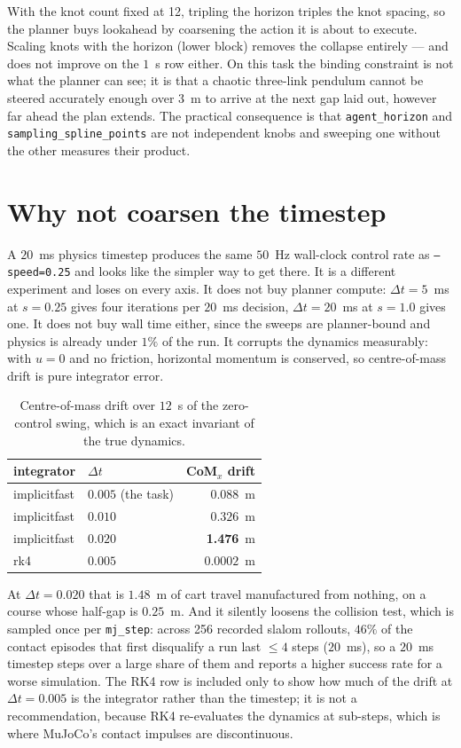 \documentclass[conference]{IEEEtran}
\begin{document}
With the knot count fixed at 12, tripling the horizon triples the knot spacing,
so the planner buys lookahead by coarsening the action it is about to execute.
Scaling knots with the horizon (lower block) removes the collapse entirely ---
and does not improve on the $1$~s row either. On this task the binding constraint
is not what the planner can see; it is that a chaotic three-link pendulum cannot
be steered accurately enough over $3$~m to arrive at the next gap laid out,
however far ahead the plan extends. The practical consequence is that
\texttt{agent\_horizon} and \texttt{sampling\_spline\_points} are not independent
knobs and sweeping one without the other measures their product.

\section{Why not coarsen the timestep}
\label{app:timestep}

A $20$~ms physics timestep produces the same $50$~Hz wall-clock control rate as
\texttt{--speed=0.25} and looks like the simpler way to get there. It is a
different experiment and loses on every axis. It does not buy planner compute:
$\Delta t = 5$~ms at $s = 0.25$ gives four iterations per $20$~ms decision,
$\Delta t = 20$~ms at $s = 1.0$ gives one. It does not buy wall time either,
since the sweeps are planner-bound and physics is already under $1\%$ of the run.
It corrupts the dynamics measurably: with $u = 0$ and no friction, horizontal
momentum is conserved, so centre-of-mass drift is pure integrator error.

\begin{table}[h]
\caption{Centre-of-mass drift over $12$~s of the zero-control swing, which is an
exact invariant of the true dynamics.}
\label{tab:timestep}
\centering
\begin{tabular}{@{}llr@{}}
\toprule
integrator & $\Delta t$ & CoM$_x$ drift \\
\midrule
implicitfast & $0.005$ (the task) & $0.088$~m \\
implicitfast & $0.010$ & $0.326$~m \\
implicitfast & $0.020$ & \textbf{1.476}~m \\
rk4          & $0.005$ & $0.0002$~m \\
\bottomrule
\end{tabular}
\end{table}

At $\Delta t = 0.020$ that is $1.48$~m of cart travel manufactured from nothing,
on a course whose half-gap is $0.25$~m. And it silently loosens the collision
test, which is sampled once per \texttt{mj\_step}: across 256 recorded slalom
rollouts, $46\%$ of the contact episodes that first disqualify a run last
$\leq 4$ steps ($20$~ms), so a $20$~ms timestep steps over a large share of them
and reports a higher success rate for a worse simulation. The RK4 row is
included only to show how much of the drift at $\Delta t = 0.005$ is the
integrator rather than the timestep; it is not a recommendation, because RK4
re-evaluates the dynamics at sub-steps, which is where MuJoCo's contact impulses
are discontinuous.
\end{document}

